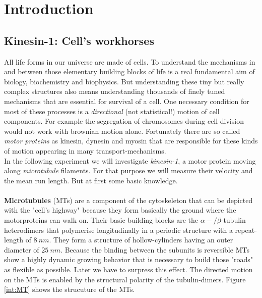 \section{Introduction}
	\subsection{Kinesin-1: Cell's workhorses}
		All life forms in our universe are made of cells. To understand the mechanisms in and between those elementary building blocks of life is a real fundamental aim of biology, biochemistry and biophysics. But understanding these tiny but really complex structures also means understanding thousands of finely tuned mechanisms that are essential for survival of a cell. One necessary condition for most of these processes is a \textit{directional} (not statistical!) motion of cell components. For example the segregation of chromosomes during cell division would not work with brownian motion alone. Fortunately there are so called \textit{motor proteins} as kinesin, dynesin and myosin that are responsible for these kinds of motion appearing in many transport-mechanisms.\\
		In the following experiment we will investigate \textit{kinesin-1}, a motor protein moving along \textit{microtubule} filaments. For that purpose we will measure their velocity and the mean run length. But at first some basic knowledge.\\
		\ \\
		\textbf{Microtubules} (MTs) are a component of the cytoskeleton that can be depicted with the "cell's highway" because they form basically the ground where the motorproteins can walk on. Their basic building blocks are the $\alpha-/\beta$-tubulin heterodimers that polymerise longitudinally in a periodic structure with a repeat-length of $8\ \unit{nm}$. They form a structure of hollow-cylinders having an outer diameter of $25\ \unit{nm}$. Because the binding between the subunits is reversible MTs show a highly dynamic growing behavior that is necessary to build those "roads" as flexible as possible. Later we have to surpress this effect. The directed motion on the MTs is enabled by the structural polarity of the tubulin-dimers. Figure \ref{int:MT} shows the strucuture of the MTs.\cite{PA}\\
